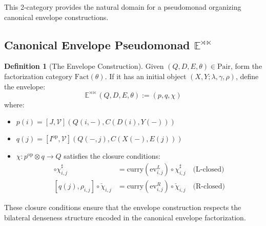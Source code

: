 \documentclass[11pt]{article}
\theoremstyle{plain}
\theoremstyle{definition}
\newtheorem{definition}[theorem]{Definition}
\theoremstyle{remark}
\newcommand{\V}{\mathcal{V}}
\newcommand{\op}{\mathrm{op}}
\newcommand{\Fact}{\mathrm{Fact}}
\newcommand{\Pair}{\mathrm{Pair}}
\begin{document}
\begin{center}
\end{center}

This 2-category provides the natural domain for a pseudomonad organizing canonical envelope constructions.

\subsection{Canonical Envelope Pseudomonad $\mathbb{E}^{\rtimes \ltimes}$}

\begin{definition}[The Envelope Construction]
Given $(Q, D, E, \theta) \in \Pair$, form the factorization category $\Fact(\theta)$. If it has an initial object $(X, Y; \lambda, \gamma, \rho)$, define the envelope:
$$
\mathbb{E}^{\rtimes \ltimes}(Q, D, E, \theta) := (p, q, \chi)
$$
where:
\begin{itemize}
\item $p(i) = [J, \V](Q(i, -), C(D(i), Y(-)))$
\item $q(j) = [I^{\op}, \V](Q(-, j), C(X(-), E(j)))$  
\item $\chi : p^{\op} \otimes q \to Q$ satisfies the closure conditions:
\begin{align}
[p(i), \lambda_{i,j}] \circ \chi^{\sharp}_{i,j} &= \mathrm{curry}(\mathrm{ev}^L_{i,j}) \circ \chi^{\sharp}_{i,j} \quad \text{(L-closed)} \\
[q(j), \rho_{i,j}] \circ \check{\chi}_{i,j} &= \mathrm{curry}(\mathrm{ev}^R_{i,j}) \circ \check{\chi}_{i,j} \quad \text{(R-closed)}
\end{align}
\end{itemize}

These closure conditions ensure that the envelope construction respects the bilateral denseness structure encoded in the canonical envelope factorization.
\end{definition}
\end{document}
